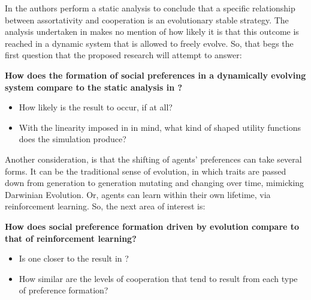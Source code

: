 \documentclass[11pt]{article}
\newcommand*{\np}{\par\noindent\newline}
\begin{document}
In \cite{alger_homo_2013} the authors perform a static analysis to
conclude that a specific relationship between assortativity and cooperation is
an evolutionary stable strategy. The analysis undertaken in \cite{alger_homo_2013} makes no mention of how likely it is that this outcome
is reached in a dynamic system that is allowed to freely evolve. So, that begs
the first question that the proposed research will attempt to answer:
\np\textbf{How does the formation of social preferences in a dynamically evolving system compare to the static analysis in \cite{alger_homo_2013}?}
\begin{itemize}
\item How likely is the \cite{alger_homo_2013} result to occur, if at all? 
\item With the linearity imposed in \cite{alger_homo_2013} in mind, what kind
of shaped utility functions does the simulation produce?
\end{itemize}
Another consideration, is that the shifting of agents' preferences can take
several forms. It can be the traditional sense of evolution, in which traits
are passed down from generation to generation mutating and changing over time,
mimicking Darwinian Evolution. Or, agents can learn within their own lifetime,
via reinforcement learning. So, the next area of interest is:
\np\textbf{How does social preference formation driven by evolution compare to that  of reinforcement learning?}
\begin{itemize}
\item Is one closer to the result in \cite{alger_homo_2013}?
\item How similar are the levels of cooperation that tend to result from each
type of preference formation?
\end{itemize}


\end{document}
